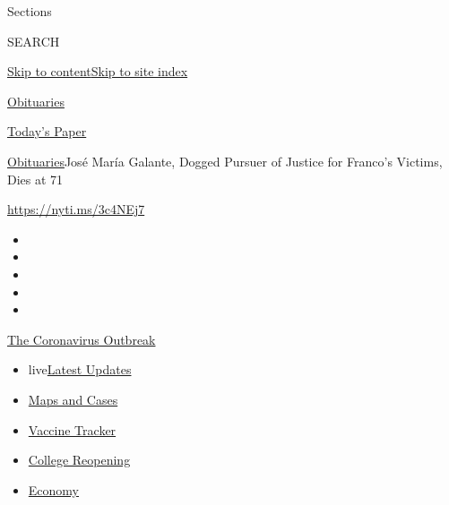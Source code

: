 Sections

SEARCH

\protect\hyperlink{site-content}{Skip to
content}\protect\hyperlink{site-index}{Skip to site index}

\href{https://www.nytimes.com/section/obituaries}{Obituaries}

\href{https://myaccount.nytimes.com/auth/login?response_type=cookie\&client_id=vi}{}

\href{https://www.nytimes.com/section/todayspaper}{Today's Paper}

\href{/section/obituaries}{Obituaries}\textbar{}José María Galante,
Dogged Pursuer of Justice for Franco's Victims, Dies at 71

\url{https://nyti.ms/3c4NEj7}

\begin{itemize}
\item
\item
\item
\item
\item
\end{itemize}

\href{https://www.nytimes.com/news-event/coronavirus?action=click\&pgtype=Article\&state=default\&region=TOP_BANNER\&context=storylines_menu}{The
Coronavirus Outbreak}

\begin{itemize}
\tightlist
\item
  live\href{https://www.nytimes.com/2020/08/03/world/coronavirus-covid-19.html?action=click\&pgtype=Article\&state=default\&region=TOP_BANNER\&context=storylines_menu}{Latest
  Updates}
\item
  \href{https://www.nytimes.com/interactive/2020/us/coronavirus-us-cases.html?action=click\&pgtype=Article\&state=default\&region=TOP_BANNER\&context=storylines_menu}{Maps
  and Cases}
\item
  \href{https://www.nytimes.com/interactive/2020/science/coronavirus-vaccine-tracker.html?action=click\&pgtype=Article\&state=default\&region=TOP_BANNER\&context=storylines_menu}{Vaccine
  Tracker}
\item
  \href{https://www.nytimes.com/2020/08/02/us/covid-college-reopening.html?action=click\&pgtype=Article\&state=default\&region=TOP_BANNER\&context=storylines_menu}{College
  Reopening}
\item
  \href{https://www.nytimes.com/live/2020/08/03/business/stock-market-today-coronavirus?action=click\&pgtype=Article\&state=default\&region=TOP_BANNER\&context=storylines_menu}{Economy}
\end{itemize}

